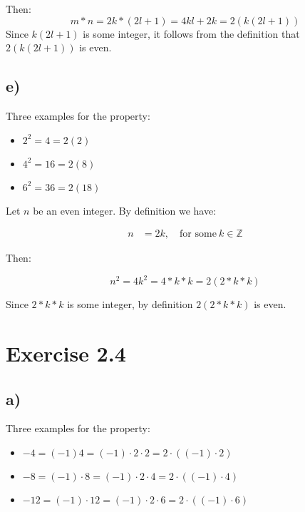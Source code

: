 \documentclass{article}
\begin{document}
Then:
\begin{equation*}
	m * n = 2k * (2l + 1) = 4kl + 2k = 2(k(2l + 1))
\end{equation*}
\noindent
Since $k(2l + 1)$ is some integer, it follows from the definition that $2(k(2l + 1))$ is
even.


\subsection*{e)}


Three examples for the property:

\begin{itemize}
	\item $2^2=4=2(2)$
	\item $4^2 = 16 = 2(8)$
	\item $6^2 = 36 = 2(18)$
\end{itemize}


Let $n$ be an even integer. By definition we have:

\begin{align*}
	n &= 2k, \quad \mbox{for some}\ k \in \mathbb{Z}
\end{align*}

Then:

\begin{equation*}
	n^2 = 4k^2 = 4 * k * k = 2(2*k*k)
\end{equation*}

Since $2*k*k$ is some integer, by definition $2(2*k*k)$ is even.


\section*{Exercise 2.4}

\subsection*{a)}


Three examples for the property:

\begin{itemize}
	\item $-4 = (-1)4 = (-1) \cdot 2 \cdot 2 = 2 \cdot ((-1)\cdot 2)$
	\item $-8 = (-1) \cdot 8 = (-1) \cdot 2 \cdot 4 = 2 \cdot ((-1)\cdot 4)$
	\item $-12 = (-1) \cdot 12 = (-1) \cdot 2 \cdot 6 = 2 \cdot ((-1)\cdot
		6)$
\end{itemize}
\end{document}

